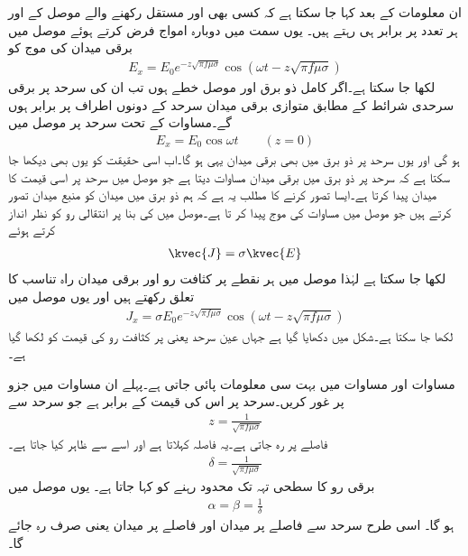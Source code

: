 ان معلومات کے بعد کہا جا سکتا ہے کہ کسی بھی اور  مستقل رکھنے والے موصل کے  اور  ہر تعدد پر برابر ہی رہتے ہیں۔ یوں  سمت میں دوبارہ امواج فرض کرتے ہوئے موصل میں برقی میدان کی موج کو
\begin{align}\label{مساوات_موج_موصل_موج}
E_x=E_0 e^{-z \sqrt{\pi f \mu \sigma}} \cos (\omega t - z \sqrt{\pi f \mu \sigma})
\end{align}
لکھا جا سکتا ہے۔اگر  کامل ذو برق اور  موصل خطے ہوں تب ان کی سرحد  پر برقی سرحدی شرائط کے مطابق متوازی برقی میدان سرحد کے دونوں اطراف پر برابر ہوں گے۔مساوات  کے تحت سرحد پر موصل میں
\begin{align}\label{مساوات_موج_موصل_ذو_برق_سرحد_موج}
E_x=E_0  \cos \omega t \quad  \quad (z=0)
\end{align}
ہو گی اور یوں سرحد پر ذو برق میں بھی برقی میدان یہی ہو گا۔اب اسی حقیقت کو یوں بھی دیکھا جا سکتا ہے کہ سرحد پر ذو برق میں برقی میدان مساوات  دیتا ہے جو موصل میں سرحد پر اسی قیمت کا میدان پیدا کرتا ہے۔ایسا تصور کرنے کا مطلب یہ ہے کہ ہم ذو برق میں میدان کو منبع میدان تصور کرتے ہیں جو موصل میں مساوات  کی موج پیدا کر تا ہے۔موصل میں  کی بنا پر انتقالی رو کو نظر انداز کرتے ہوئے
\begin{align}
\kvec{J}=\sigma \kvec{E}
\end{align}
لکھا جا سکتا ہے لہٰذا موصل میں ہر نقطے پر کثافت رو اور برقی میدان راہ تناسب کا تعلق رکھتے ہیں اور یوں موصل میں
\begin{align}\label{مساوات_موج_موصل_کثافت_رو_موج}
J_x=\sigma E_0 e^{-z \sqrt{\pi f \mu \sigma}} \cos (\omega t - z \sqrt{\pi f \mu \sigma})
\end{align}
لکھا جا سکتا ہے۔شکل  میں  دکھایا گیا ہے جہاں عین سرحد یعنی  پر کثافت رو کی قیمت  کو  لکھا گیا ہے۔

مساوات  اور مساوات  میں بہت سی معلومات پائی جاتی ہے۔پہلے ان مساوات میں
   جزو پر غور کریں۔سرحد پر اس کی قیمت  کے برابر ہے جو سرحد سے
\begin{align*}
z=\frac{1}{\sqrt{\pi f \mu \sigma}}
\end{align*}
فاصلے پر  رہ جاتی ہے۔یہ فاصلہ  کہلاتا ہے  اور اسے   سے ظاہر کیا جاتا ہے۔
\begin{align}\label{مساوات_موج_گہرائی_جلد_تعریف}
\delta =\frac{1}{\sqrt{\pi f \mu \sigma}}
\end{align}
برقی رو کا سطحی تہہ تک محدود رہنے کو  کہا جاتا ہے۔
یوں موصل میں
\begin{align}\label{مساوات_موج_گہرائی_جلد_کے_تعلق}
\alpha=\beta=\frac{1}{\delta}
\end{align}
ہو گا۔
اسی طرح سرحد سے  فاصلے پر میدان  اور   فاصلے پر میدان  یعنی صرف  رہ جائے گا۔

